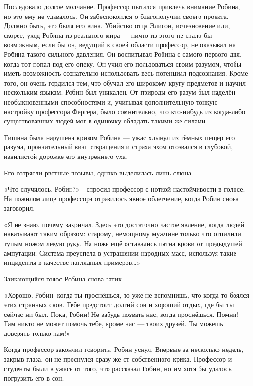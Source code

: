 \documentclass[a5paper, 9pt,
final, openany, twoside=true]{memoir}
\begin{document}
Последовало долгое молчание. Профессор пытался привлечь внимание Робина, но это ему не удавалось. Он забеспокоился о благополучии своего проекта. Должно быть, это была его вина. Убийство отца Элисон, исчезновение или, скорее, уход Робина из реального мира — ничто из этого не стало бы возможным, если бы он, ведущий в своей области профессор, не оказывал на Робина такого сильного давления. Он воспитывал Робина с самого первого дня, когда тот попал под его опеку. Он учил его пользоваться своим разумом, чтобы иметь возможность сознательно использовать весь потенциал подсознания. Кроме того, он очень гордился тем, что обучал его широкому кругу предметов и научил нескольким языкам. Робин был уникален. От природы его разум был наделён необыкновенными способностями и, учитывая дополнительную тонкую настройку профессора Фергера, было сомнительно, что кто-нибудь из когда-либо существовавших людей мог в одиночку обладать такими же силами.\bigskip

Тишина была нарушена криком Робина — ужас хлынул из тёмных пещер его разума, пронзительный визг отвращения и страха эхом отозвался в глубокой, извилистой дорожке его внутреннего уха.

Его сотрясли рвотные позывы, однако выделилась лишь слюна.

«Что случилось, Робин?» - спросил профессор с ноткой настойчивости в голосе. На пожилом лице профессора отразилось явное облегчение, когда Робин снова заговорил.

«Я не знаю, почему закричал. Здесь это достаточно частое явление, когда людей наказывают таким образом: старому, немощному мужчине только что отпилили тупым ножом левую руку. На ноже ещё оставались пятна крови от предыдущей ампутации. Система преуспела в устрашении народных масс, используя такие инциденты в качестве наглядных примеров…»

Заикающийся голос Робина снова затих.

«Хорошо, Робин, когда ты проснёшься, то уже не вспомнишь, что когда-то боялся этих странных снов. Тебе предстоит долгий сон и хороший отдых, где бы ты сейчас ни был. Пока, Робин! Не забудь позвать нас, когда проснёшься. Помни! Там никто не может помочь тебе, кроме нас — твоих друзей. Ты можешь доверять только нам!»

Когда профессор закончил говорить, Робин уснул. Впервые за несколько недель, закрыв глаза, он не проснулся сразу же от собственного крика. Профессор и студенты были в ужасе от того, что рассказал Робин, но им хотя бы удалось погрузить его в сон.
\end{document}
